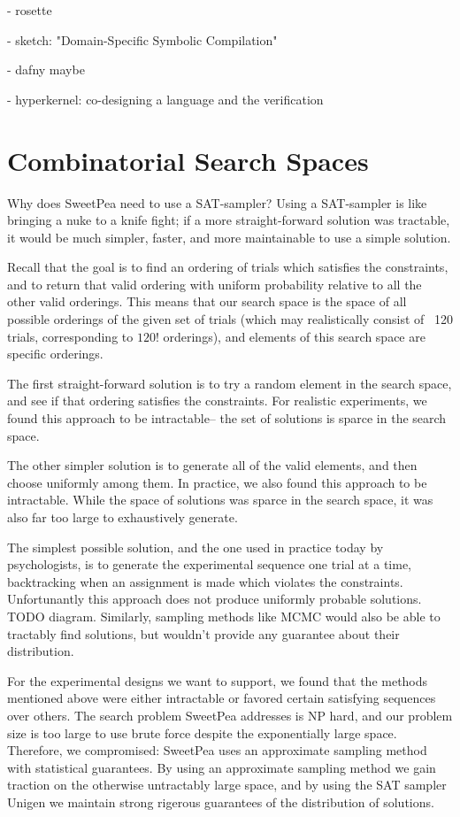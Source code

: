- rosette \cite{torlak2014lightweight}

- sketch: "Domain-Specific Symbolic Compilation"

- dafny maybe

- hyperkernel: co-designing a language and the verification


\section{Combinatorial Search Spaces}

Why does SweetPea need to use a SAT-sampler? Using a SAT-sampler is like bringing a nuke to a knife fight; if a more straight-forward solution was tractable, it would be much simpler, faster, and more maintainable to use a simple solution.

Recall that the goal is to find an ordering of trials which satisfies the constraints, and to return that valid ordering with uniform probability relative to all the other valid orderings. This means that our search space is the space of all possible orderings of the given set of trials (which may realistically consist of ~120 trials, corresponding to $120!$ orderings), and elements of this search space are specific orderings.

The first straight-forward solution is to try a random element in the search space, and see if that ordering satisfies the constraints. For realistic experiments, we found this approach to be intractable-- the set of solutions is sparce in the search space.

The other simpler solution is to generate all of the valid elements, and then choose uniformly among them. In practice, we also found this approach to be intractable. While the space of solutions was sparce in the search space, it was also far too large to exhaustively generate.

The simplest possible solution, and the one used in practice today by psychologists, is to generate the experimental sequence one trial at a time, backtracking when an assignment is made which violates the constraints. Unfortunantly this approach does not produce uniformly probable solutions. TODO diagram. Similarly, sampling methods like MCMC would also be able to tractably find solutions, but wouldn't provide any guarantee about their distribution.

For the experimental designs we want to support, we found that the methods mentioned above were either intractable or favored certain satisfying sequences over others. The search problem SweetPea addresses is NP hard, and our problem size is too large to use brute force despite the exponentially large space. Therefore, we compromised: SweetPea uses an approximate sampling method with statistical guarantees. By using an approximate sampling method we gain traction on the otherwise untractably large space, and by using the SAT sampler Unigen we maintain strong rigerous guarantees of the distribution of solutions.

